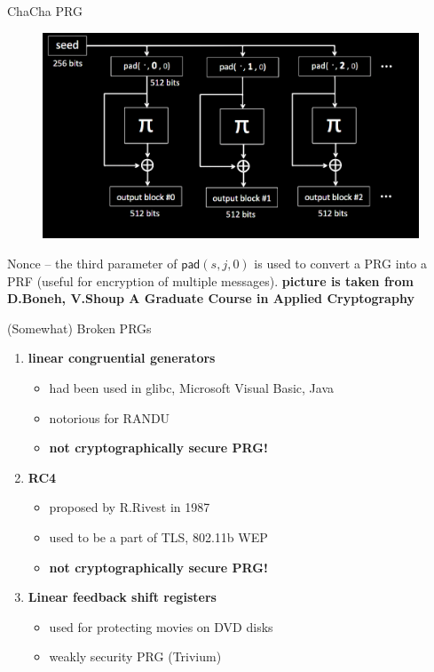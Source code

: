 \documentclass[usenames,dvipsnames, 9pt,aspectratio=169]{beamer}
\begin{document}
\begin{frame}{ChaCha PRG}
\begin{figure}
	\includegraphics[width=\textwidth]{ChaCha20}
\end{figure}

Nonce -- the third parameter of $\mathsf{pad}(s, j, 0)$ is used to convert a PRG into a PRF (useful for encryption of multiple messages).
\vfill
\small
{\color{gray}\textbf{picture is taken from D.Boneh, V.Shoup A Graduate Course in Applied Cryptography}} 
\end{frame}

\begin{frame}{(Somewhat) Broken PRGs}
\LARGE
\begin{enumerate}
	\itemsep2em 
	\item {\color{Orange}\textbf{linear congruential generators}} 
	\begin{itemize}
		\LARGE
				\itemsep5pt  
		\item had been used in glibc, Microsoft Visual Basic, Java
		\item notorious for RANDU
		\item \textbf{not cryptographically secure PRG!}
	\end{itemize}

	\item {\color{Orange}\textbf{RC4}} 
	\begin{itemize}
		\LARGE
		\itemsep5pt 
		\item proposed by R.Rivest  in 1987
		\item used to be a part of TLS, 802.11b WEP
		\item \textbf{not cryptographically secure PRG!}
	\end{itemize}

	\item {\color{Orange}\textbf{Linear feedback shift registers}}
	\begin{itemize}
			\LARGE
			\itemsep5pt
		\item used for protecting movies on DVD disks
		\item weakly security  PRG (Trivium)
	\end{itemize} 
\end{enumerate}

\end{frame}
\end{document}
